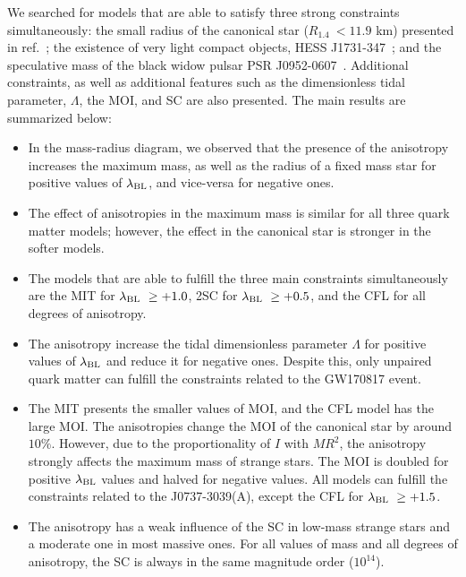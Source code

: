 \documentclass[%
reprint,
superscriptaddress,
nofootinbib,
amsmath,
amssymb,
aps,
floatfix,
showkeys,
]{revtex4-2}
\begin{document}
We searched for models that are able to satisfy three strong constraints simultaneously: the small radius of the canonical star ($R_{1.4}~< 11.9$ km) presented in ref.~\cite{Capano_2020}; the existence of very light compact objects, HESS J1731-347~\cite{Doroshenko_2022}; and the speculative mass of the black widow pulsar PSR J0952-0607~\cite{Romani_2022}. Additional constraints, as well as additional features such as the dimensionless tidal parameter, $\Lambda$, the MOI, and SC are also presented. The main results are summarized below:
\begin{itemize}

    \item In the mass-radius diagram, we observed that the presence of the anisotropy increases the maximum mass, as well as the radius of a fixed mass star for positive values of $\lambda_{\rm BL}$, and vice-versa for negative ones.

    \item The effect of anisotropies in the maximum mass is similar for all three quark matter models; however, the effect in the canonical star is stronger in the softer models.

    \item The models that are able to fulfill the three main constraints simultaneously are the MIT for       $\lambda_{\rm BL}~\geq +1.0$, 2SC for $\lambda_{\rm BL}~\geq +0.5$, and the CFL for all degrees of anisotropy. 

     \item The anisotropy increase the tidal dimensionless parameter $\Lambda$ for positive values of $\lambda_{\rm BL}$ and reduce it for negative ones. Despite this, only unpaired quark matter can fulfill the constraints related to the GW170817 event.

     \item The MIT  presents the smaller values of MOI, and the CFL model has the large MOI. The anisotropies change the MOI of the canonical star by around $10\%$. However, due to the proportionality of $I$ with $MR^2$, the anisotropy strongly affects the maximum mass of strange stars. The MOI is doubled for positive $\lambda_{\rm BL}$ values and halved for negative values. All models can fulfill the constraints related to the J0737-3039(A), except the CFL for $\lambda_{\rm BL}~\geq +1.5$.

     \item The anisotropy has a weak influence of the SC in low-mass strange stars and a moderate one in most massive ones. For all values of mass and all degrees of anisotropy, the SC is always in the same magnitude order ($10^{14}$). 


\end{itemize}
\end{document}
